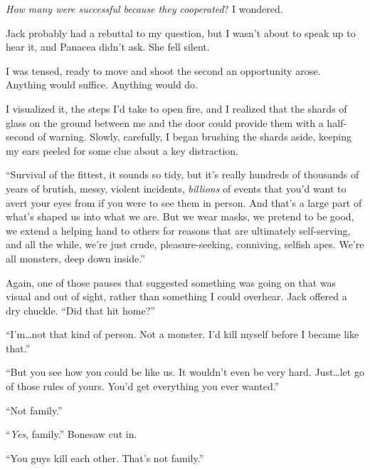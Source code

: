 \emph{How many were successful because they cooperated}?  I wondered.



Jack probably had a rebuttal to my question, but I wasn't about to speak up to hear it, and Panacea didn't ask.  She fell silent.



I was tensed, ready to move and shoot the second an opportunity arose.  Anything would suffice.  Anything would do.



I visualized it, the steps I'd take to open fire, and I realized that the shards of glass on the ground between me and the door could provide them with a half-second of warning.  Slowly, carefully, I began brushing the shards aside, keeping my ears peeled for some clue about a key distraction.



``Survival of the fittest, it sounds so tidy, but it's really hundreds of thousands of years of brutish, messy, violent incidents, \emph{billions} of events that you'd want to avert your eyes from if you were to see them in person.  And that's a large part of what's shaped us into what we are.  But we wear masks, we pretend to be good, we extend a helping hand to others for reasons that are ultimately self-serving, and all the while, we're just crude, pleasure-seeking, conniving, selfish apes.  We're all monsters, deep down inside.''



Again, one of those pauses that suggested something was going on that was visual and out of sight, rather than something I could overhear.  Jack offered a dry chuckle.  ``Did that hit home?''



``I'm\ldots not that kind of person.  Not a monster.  I'd kill myself before I became like that.''



``But you see how you could be like us.  It wouldn't even be very hard.  Just\ldots let go of those rules of yours.  You'd get everything you ever wanted.''



``Not family.''



``\emph{Yes}, family.''  Bonesaw cut in.



``You guys kill each other.  That's not family.''



